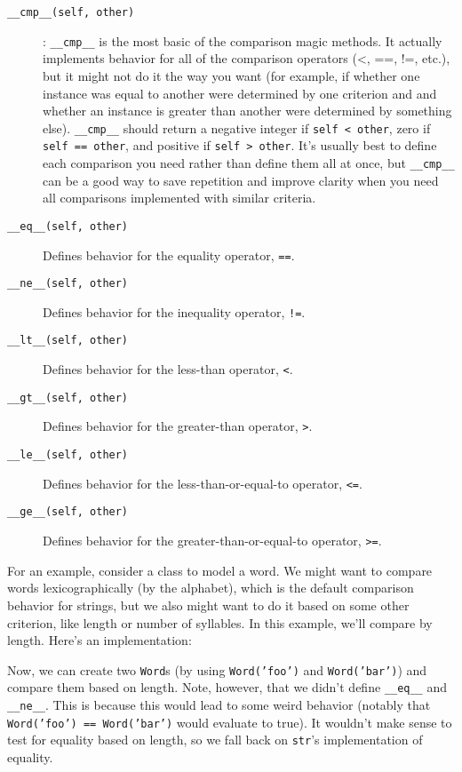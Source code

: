 \documentclass[a4paper,11pt]{article}
\newcommand{\code}[1]{\texttt{#1}}
\begin{document}
\begin{description}

\item[\code{__cmp__(self, other)}]
:    \code{__cmp__} is the most basic of the comparison magic methods. It actually implements behavior for all of the comparison operators (<, ==, !=, etc.), but it might not do it the way you want (for example, if whether one instance was equal to another were determined by one criterion and and whether an instance is greater than another were determined by something else). \code{__cmp__} should return a negative integer if \code{self < other}, zero if \code{self == other}, and positive if \code{self > other}. It's usually best to define each comparison you need rather than define them all at once, but \code{__cmp__} can be a good way to save repetition and improve clarity when you need all comparisons implemented with similar criteria.

\item[\code{__eq__(self, other)}]
Defines behavior for the equality operator, \code{==}.
\item[\code{__ne__(self, other)}]
Defines behavior for the inequality operator, \code{!=}.
\item[\code{__lt__(self, other)}]
Defines behavior for the less-than operator, \code{<}.
\item[\code{__gt__(self, other)}]
Defines behavior for the greater-than operator, \code{>}.
\item[\code{__le__(self, other)}]
Defines behavior for the less-than-or-equal-to operator, \code{<=}.
\item[\code{__ge__(self, other)}]
Defines behavior for the greater-than-or-equal-to operator, \code{>=}.

\end{description}

For an example, consider a class to model a word. We might want to compare words lexicographically (by the alphabet), which is the default comparison behavior for strings, but we also might want to do it based on some other criterion, like length or number of syllables. In this example, we'll compare by length. Here's an implementation:



Now, we can create two \code{Word}s (by using \code{Word('foo')} and \code{Word('bar')}) and compare them based on length. Note, however, that we didn't define \code{__eq__} and \code{__ne__}. This is because this would lead to some weird behavior (notably that \code{Word('foo') == Word('bar')} would evaluate to true). It wouldn't make sense to test for equality based on length, so we fall back on \code{str}'s implementation of equality.
\end{document}
